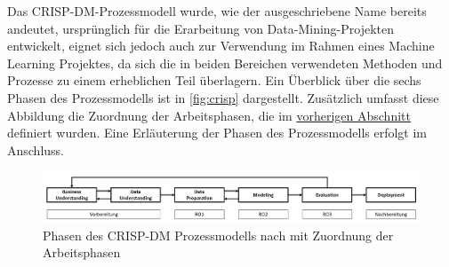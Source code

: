 Das CRISP-DM-Prozessmodell wurde, wie der ausgeschriebene Name bereits andeutet, ursprünglich für die Erarbeitung von Data-Mining-Projekten entwickelt, eignet sich jedoch auch zur Verwendung im Rahmen eines Machine Learning Projektes, da sich die in beiden Bereichen verwendeten Methoden und Prozesse zu einem erheblichen Teil überlagern. Ein Überblick über die sechs Phasen des Prozessmodells ist in \autoref{fig:crisp} dargestellt. Zusätzlich umfasst diese Abbildung die Zuordnung der Arbeitsphasen, die im \hyperref[phases_definition]{vorherigen Abschnitt} definiert wurden. Eine Erläuterung der Phasen des Prozessmodells erfolgt im Anschluss. 

\begin{figure}[t]
    \centering
    \includegraphics[width=\textwidth]{images/CRISP-DM}
    \caption{Phasen des CRISP-DM Prozessmodells nach \cite{Chapman2000} mit Zuordnung der Arbeitsphasen}\label{fig:crisp}
\end{figure}

